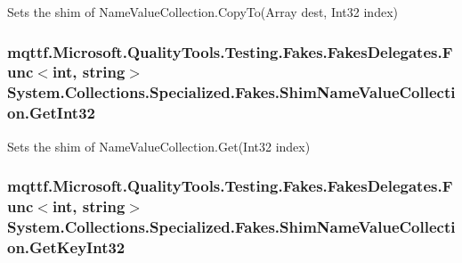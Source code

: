Sets the shim of Name\-Value\-Collection.\-Copy\-To(\-Array dest, Int32 index)

\hypertarget{class_system_1_1_collections_1_1_specialized_1_1_fakes_1_1_shim_name_value_collection_af46bbfe15bb17b79d770b18da3ac1a26}{
\subsubsection[{Get\-Int32}]{\setlength{\rightskip}{0pt plus 5cm}mqttf.\-Microsoft.\-Quality\-Tools.\-Testing.\-Fakes.\-Fakes\-Delegates.\-Func$<$int, string$>$ System.\-Collections.\-Specialized.\-Fakes.\-Shim\-Name\-Value\-Collection.\-Get\-Int32\hspace{0.3cm}{\ttfamily [set]}}}\label{class_system_1_1_collections_1_1_specialized_1_1_fakes_1_1_shim_name_value_collection_af46bbfe15bb17b79d770b18da3ac1a26}


Sets the shim of Name\-Value\-Collection.\-Get(\-Int32 index)

\hypertarget{class_system_1_1_collections_1_1_specialized_1_1_fakes_1_1_shim_name_value_collection_a7e207f2a9734fc7d0f16668e6f392bb3}{
\subsubsection[{Get\-Key\-Int32}]{\setlength{\rightskip}{0pt plus 5cm}mqttf.\-Microsoft.\-Quality\-Tools.\-Testing.\-Fakes.\-Fakes\-Delegates.\-Func$<$int, string$>$ System.\-Collections.\-Specialized.\-Fakes.\-Shim\-Name\-Value\-Collection.\-Get\-Key\-Int32\hspace{0.3cm}{\ttfamily [set]}}}\label{class_system_1_1_collections_1_1_specialized_1_1_fakes_1_1_shim_name_value_collection_a7e207f2a9734fc7d0f16668e6f392bb3}


